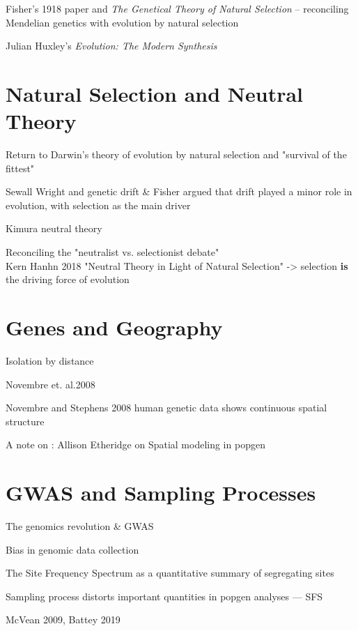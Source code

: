 Fisher's 1918 paper and \textit{The Genetical Theory of Natural Selection} -- reconciling Mendelian genetics with evolution by natural selection


Julian Huxley's \textit{Evolution: The Modern Synthesis}


\section{Natural Selection and Neutral Theory}
Return to Darwin's theory of evolution by natural selection and "survival of the fittest"  


Sewall Wright and genetic drift & Fisher argued that drift played a minor role in evolution, with selection as the main driver


Kimura neutral theory


Reconciling the "neutralist vs. selectionist debate"
\\
Kern Hanhn 2018 "Neutral Theory in Light of Natural Selection" -> selection \textbf{is} the driving force of evolution

\section{Genes and Geography}
Isolation by distance

Novembre et. al.2008


Novembre and Stephens 2008 human genetic data shows continuous spatial structure 


A note on
: Allison Etheridge on Spatial modeling in popgen 

\section{GWAS and Sampling Processes}
The genomics revolution & GWAS


Bias in genomic data collection


The Site Frequency Spectrum as a quantitative summary of segregating sites 


Sampling process distorts important quantities in popgen analyses --- SFS

McVean 2009, Battey 2019 

\newpage
